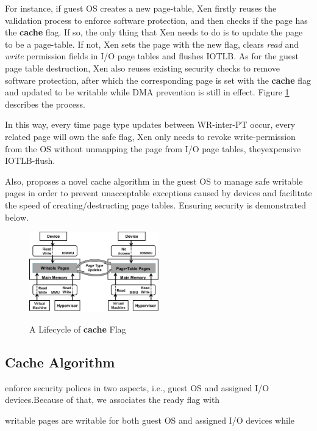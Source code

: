 For instance, if guest OS creates a new page-table, Xen firstly reuses the validation process to enforce software protection, and then checks if the page has the \textbf{cache} flag. If so, the only thing that Xen needs to do is to update the page to be a page-table. If not, Xen sets the page with the new flag, clears \emph{read} and \emph{write} permission fields in I/O page tables and flushes IOTLB. As for the guest page table destruction, Xen also reuses existing security checks to remove software protection, after which the corresponding page is set with the \textbf{cache} flag and updated to be writable while DMA prevention is still in effect. Figure \ref{fig:safe-flag} describes the process.

In this way, every time page type updates between WR-inter-PT occur, every related page will own the safe flag, 
 Xen only needs to revoke write-permission from the OS without unmapping the page from I/O page tables, theyexpensive IOTLB-flush. 

Also, \name proposes a novel cache algorithm in the guest OS to manage safe writable pages in order to prevent unacceptable exceptions caused by devices and facilitate the speed of creating/destructing page tables.
Ensuring security is demonstrated below.

\begin{figure}[ht]
\centering
\includegraphics[width=0.5\textwidth]{image/background/wr2pt.png} \\
\caption{A Lifecycle of \textbf{cache} Flag}
\label{fig:safe-flag}
\end{figure}

\subsection{Cache Algorithm}



enforce security polices in two aspects, i.e., guest OS and assigned I/O devices.Because of that, we associates the ready flag with

writable pages are writable for both guest OS and assigned I/O devices while

